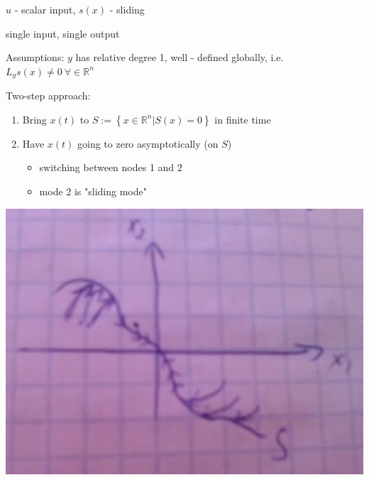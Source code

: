 $u$ - scalar input, $s(x)$ - sliding

single input, single output 

Assumptions: $y$ has relative degree 1, well - defined globally, i.e. $L_gs(x) \neq 0 \ \forall \in \mathbb{R}^n$

Two-step approach:
\begin{enumerate}
\item Bring $x(t)$ to $S := \left \{ x \in \mathbb{R}^n | S(x) = 0 \right\}$ in finite time
\item Have $x(t)$ going to zero asymptotically (on $S$)
\begin{itemize}
\item switching between nodes 1 and 2
\item mode 2 is "sliding mode"
\end{itemize}
\end{enumerate} 

\begin{center}
	\includegraphics[scale=0.1]{2}
\end{center}

